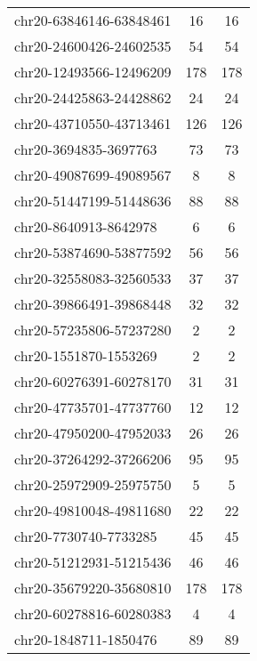 \begin{longtable}{lSS}
	chr20-63846146-63848461 & 16     & 16                         \\
	chr20-24600426-24602535 & 54     & 54                         \\
	chr20-12493566-12496209 & 178    & 178                        \\
	chr20-24425863-24428862 & 24     & 24                         \\
	chr20-43710550-43713461 & 126    & 126                        \\
	chr20-3694835-3697763   & 73     & 73                         \\
	chr20-49087699-49089567 & 8      & 8                          \\
	chr20-51447199-51448636 & 88     & 88                         \\
	chr20-8640913-8642978   & 6      & 6                          \\
	chr20-53874690-53877592 & 56     & 56                         \\
	chr20-32558083-32560533 & 37     & 37                         \\
	chr20-39866491-39868448 & 32     & 32                         \\
	chr20-57235806-57237280 & 2      & 2                          \\
	chr20-1551870-1553269   & 2      & 2                          \\
	chr20-60276391-60278170 & 31     & 31                         \\
	chr20-47735701-47737760 & 12     & 12                         \\
	chr20-47950200-47952033 & 26     & 26                         \\
	chr20-37264292-37266206 & 95     & 95                         \\
	chr20-25972909-25975750 & 5      & 5                          \\
	chr20-49810048-49811680 & 22     & 22                         \\
	chr20-7730740-7733285   & 45     & 45                         \\
	chr20-51212931-51215436 & 46     & 46                         \\
	chr20-35679220-35680810 & 178    & 178                        \\
	chr20-60278816-60280383 & 4      & 4                          \\
	chr20-1848711-1850476   & 89     & 89                         \\

\end{longtable}
